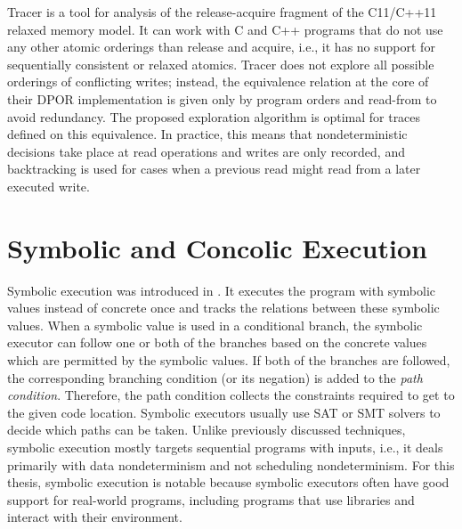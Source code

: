 Tracer  is a tool for analysis of the release-acquire fragment of the C11/C++11 relaxed memory model.
It can work with C and C++ programs that do not use any other atomic orderings than release and acquire, i.e., it has no support for sequentially consistent or relaxed atomics.
Tracer does not explore all possible orderings of conflicting writes; instead, the equivalence relation at the core of their DPOR implementation is given only by program orders and read-from to avoid redundancy.
The proposed exploration algorithm is optimal for traces defined on this equivalence.
In practice, this means that nondeterministic decisions take place at read operations and writes are only recorded, and backtracking is used for cases when a previous read might read from a later executed write.


\section{Symbolic and Concolic Execution}

Symbolic execution was introduced in .
It executes the program with symbolic values instead of concrete once and tracks the relations between these symbolic values.
When a symbolic value is used in a conditional branch, the symbolic executor can follow one or both of the branches based on the concrete values which are permitted by the symbolic values.
If both of the branches are followed, the corresponding branching condition (or its negation) is added to the \emph{path condition}.
Therefore, the path condition collects the constraints required to get to the given code location.
Symbolic executors usually use SAT or SMT solvers to decide which paths can be taken.
Unlike previously discussed techniques, symbolic execution mostly targets sequential programs with inputs, i.e., it deals primarily with data nondeterminism and not scheduling nondeterminism.
For this thesis, symbolic execution is notable because symbolic executors often have good support for real-world programs, including programs that use libraries and interact with their environment.

